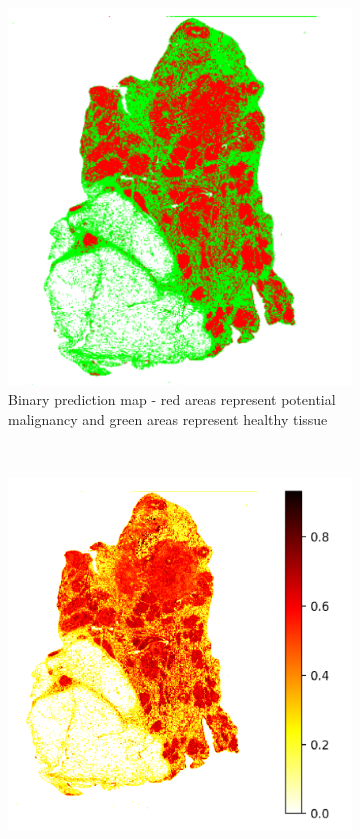 \documentclass{l4proj}
\begin{document}
\begin{figure}[h]
    \centering
    \begin{subfigure}[b]{0.4\textwidth}
        \includegraphics[scale=0.37]{images/TCGA-BH-A1FE-noback.png}
        \caption{Binary prediction map - red areas represent potential malignancy and green areas represent healthy tissue}
        \label{fig:binary-map}
    \end{subfigure}\hfill%
    ~~
    \begin{subfigure}[b]{0.4\textwidth}
        \includegraphics[scale=0.3]{images/TCGA-BH-A1FE-continuous.png}

\end{subfigure}
\end{figure}
\end{document}
